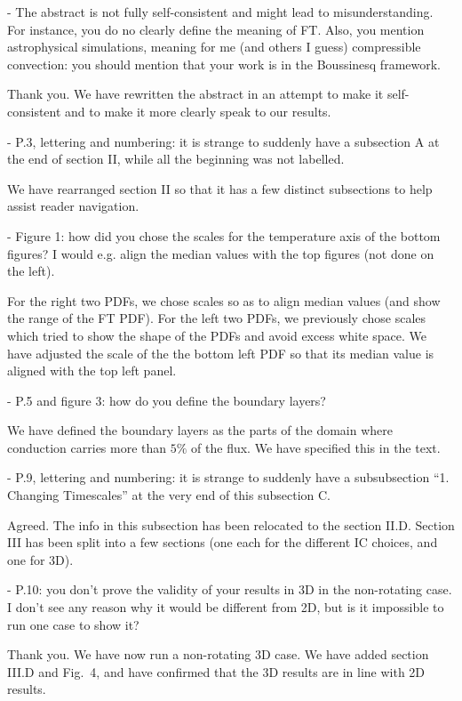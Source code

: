 \documentclass[aps, 11pt, singlecolumn]{revtex4-1} %
\begin{document}
\begin{singlespace}
\begin{myquotation}
-       The abstract is not fully self-consistent and might lead to misunderstanding.
For instance, you do no clearly define the meaning of FT. 
Also, you mention astrophysical simulations, meaning for me (and others I guess) compressible convection: you should mention that your work is in the Boussinesq framework.
\end{myquotation}
Thank you.
We have rewritten the abstract in an attempt to make it self-consistent and to make it more clearly speak to our results.
\begin{myquotation}
-       P.3, lettering and numbering: it is strange to suddenly have a subsection A at the end of section II, while all the beginning was not labelled.
\end{myquotation}
We have rearranged section II so that it has a few distinct subsections to help assist reader navigation.
\begin{myquotation}
-       Figure 1: how did you chose the scales for the temperature axis of the bottom figures? 
I would e.g. align the median values with the top figures (not done on the left).
\end{myquotation}
For the right two PDFs, we chose scales so as to align median values (and show the range of the FT PDF).
For the left two PDFs, we previously chose scales which tried to show the shape of the PDFs and avoid excess white space.
We have adjusted the scale of the the bottom left PDF so that its median value is aligned with the top left panel.
\begin{myquotation}
-       P.5 and figure 3: how do you define the boundary layers?
\end{myquotation}
We have defined the boundary layers as the parts of the domain where conduction carries more than $5\%$ of the flux.
We have specified this in the text.
\begin{myquotation}
-       P.9, lettering and numbering: it is strange to suddenly have a subsubsection “1. Changing Timescales” at the very end of this subsection C.
\end{myquotation}
Agreed.
The info in this subsection has been relocated to the section II.D.
Section III has been split into a few sections (one each for the different IC choices, and one for 3D).

\begin{myquotation}
-       P.10: you don’t prove the validity of your results in 3D in the non-rotating case. 
I don’t see any reason why it would be different from 2D, but is it impossible to run one case to show it?
\end{myquotation}
Thank you.
We have now run a non-rotating 3D case.
We have added section III.D and Fig.~4, and have confirmed that the 3D results are in line with 2D results.


\end{singlespace}
\end{document}
